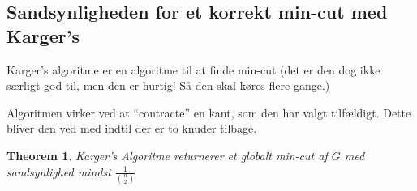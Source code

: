 \documentclass[11pt]{article}
\newtheorem{theorem}{Theorem}
\theoremstyle{definition}
\theoremstyle{remark}
\begin{document}
\subsection{Sandsynligheden for et korrekt min-cut med Karger's}
\label{subsec:label}


Karger's algoritme er en algoritme til at finde min-cut (det er den dog ikke særligt god til, men den er hurtig! Så den skal køres flere gange.)

Algoritmen virker ved at ``contracte'' en kant, som den har valgt tilfældigt. Dette bliver den ved med indtil der er to knuder tilbage. 

\begin{theorem}
  Karger's Algoritme returnerer et globalt min-cut af $G$ med sandsynlighed mindst $\frac{1}{\binom{n}{2}}$

\end{theorem}
\end{document}
